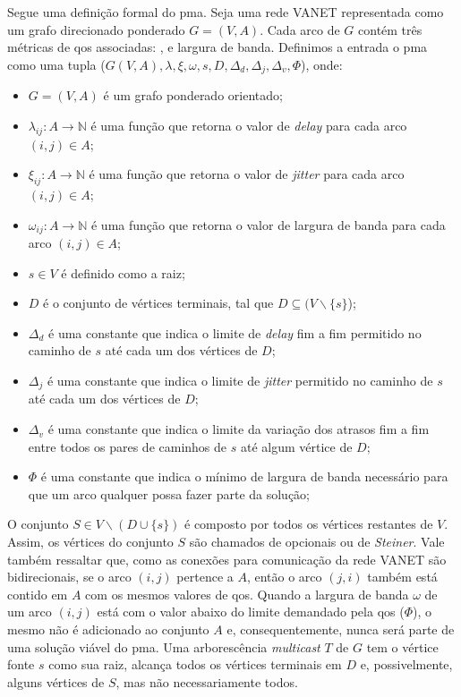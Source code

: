 Segue  uma  definição  formal  do  \gls{pma}.   Seja  uma  rede  VANET
representada como  um grafo direcionado  ponderado $G = (V,  A)$. Cada
arco de  $G$ contém três  métricas de \gls{qos} associadas:  {\delay ,
  \jitter} e largura  de banda.  Definimos a entrada  o \gls{pma} como
uma  tupla  ($G(V,  A),  \lambda,   \xi,  \omega,  s,  D,  \Delta_{d},
\Delta_{j}, \Delta_{v}, \Phi$), onde:

\begin{itemize}
    \item $G = (V, A)$ é um grafo ponderado orientado;
    \item $\lambda_{ij} :  A \rightarrow \mathbb{N}$ é  uma função que
      retorna o valor de \textit{delay} para cada arco $(i, j) \in A$;
    \item  $\xi_{ij} :  A  \rightarrow \mathbb{N}$  é  uma função  que
      retorna o  valor de \textit{jitter}  para cada arco $(i,  j) \in
      A$;
    \item $\omega_{ij}  : A \rightarrow  \mathbb{N}$ é uma  função que
      retorna o valor  de largura de banda para cada  arco $(i, j) \in
      A$;
    \item $s \in V$ é definido como a raiz;
    \item $D$ é o conjunto de vértices terminais, tal que $D \subseteq
      (V \backslash \{s\}$);
    \item  $\Delta_{d}$  é  uma  constante  que  indica  o  limite  de
      \textit{delay} fim a fim permitido no caminho de $s$ até cada um
      dos vértices de $D$;
    \item  $\Delta_{j}$  é  uma  constante  que  indica  o  limite  de
      \textit{jitter}  permitido no  caminho de  $s$ até  cada um  dos
      vértices de $D$;
    \item $\Delta_{v}$ é uma constante que indica o limite da variação
      dos atrasos  fim a fim entre  todos os pares de  caminhos de $s$
      até algum vértice de $D$;
    \item $\Phi$  é uma constante  que indica  o mínimo de  largura de
      banda necessário para que um  arco qualquer possa fazer parte da
      solução;
\end{itemize}

O conjunto $S \in V \backslash (D \cup \{s\})$ é composto por todos os
vértices  restantes de  $V$. Assim,  os vértices  do conjunto  $S$ são
chamados de  opcionais ou  de \textit{Steiner}. Vale  também ressaltar
que,   como  as   conexões  para   comunicação  da   rede  VANET   são
bidirecionais, se  o arco $(i, j)$  pertence a $A$, então  o arco $(j,
i)$   também  está   contido  em   $A$  com   os  mesmos   valores  de
\gls{qos}. Quando a largura de banda $\omega$ de um arco $(i, j)$ está
com  o valor  abaixo do  limite demandado  pela \gls{qos}  ($\Phi$), o
mesmo não é adicionado ao conjunto $A$ e, consequentemente, nunca será
parte  de   uma  solução  viável  do   \gls{pma}.   Uma  arborescência
\textit{multicast} $T$ de  $G$ tem o vértice fonte $s$  como sua raiz,
alcança todos  os vértices terminais  em $D$ e,  possivelmente, alguns
vértices de $S$, mas não necessariamente todos.

